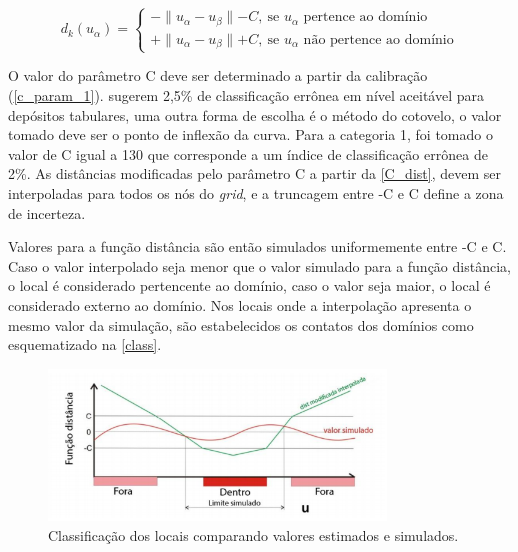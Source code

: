 \begin{equation}
	d_k(u_\alpha)=\begin{cases}
	-\parallel u_\alpha-u_\beta\parallel - C,\:\textrm{se $u_\alpha$ pertence ao domínio}\\
	+\parallel u_\alpha-u_\beta\parallel + C,\:\textrm{se $u_\alpha$ não pertence ao domínio}\end{cases}
    \label{C_dist}
\end{equation}

O valor do parâmetro C deve ser determinado a partir da calibração (\autoref{c_param_1}).  sugerem 2,5\% de classificação errônea em nível aceitável para depósitos tabulares, uma outra forma de escolha é o método do cotovelo, o valor tomado deve ser o ponto de inflexão da curva. Para a categoria 1, foi tomado o valor de C igual a 130 que corresponde a um índice de classificação errônea de 2\%. As distâncias modificadas pelo parâmetro C a partir da \autoref{C_dist}, devem ser interpoladas para todos os nós do \textit{grid}, e a truncagem entre -C e C define a zona de incerteza.

Valores para a função distância são então simulados uniformemente entre -C e C. Caso o valor interpolado seja menor que o valor simulado para a função distância, o local é considerado pertencente ao domínio, caso o valor seja maior, o local é considerado externo ao domínio. Nos locais onde a interpolação apresenta o mesmo valor da simulação, são estabelecidos os contatos dos domínios como esquematizado na \autoref{class}.

\begin{figure}[H]
	\caption{\label{class}Classificação dos locais comparando valores estimados e simulados.}
	\begin{center}
		\includegraphics[width=0.8\textwidth]{capitulo_2/classificacao.png}
	\end{center}
\end{figure}

